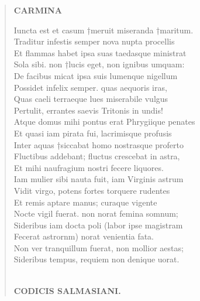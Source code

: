 \documentclass[11pt, a4paper]{report}
\begin{document}
\begin{verse}
     \marginpar{[188]} \begin{center} \textbf{CARMINA} \end{center}Iuncta est et casum †meruit miseranda †maritum. \\ Traditur infestis semper nova nupta procellis \\ Et flammas habet ipsa suas taedasque ministrat \\ Sola sibi. non †lucis eget, non ignibus umquam: \\ De facibus micat ipsa suis lumenque nigellum \\ Possidet infelix semper. quas aequoris iras, \\ Quas caeli terraeque lues miserabile vulgus \\ Pertulit, errantes saevis Tritonis in undis! \\ Atque domus mihi pontus erat Phrygiique penates \\ Et quasi iam pirata fui, lacrimisque profusis \\ Inter aquas †siccabat homo nostrasque proferto \\ Fluctibus addebant; fluctus crescebat in astra, \\ Et mihi naufragium nostri fecere liquores. \\ Iam mulier sibi nauta fuit, iam Virginis astrum \\ Vidit virgo, potens fortes torquere rudentes \\ Et remis aptare manus; curaque vigente \\ Nocte vigil fuerat. non norat femina somnum; \\ Sideribus iam docta poli (labor ipse magistram \\ Fecerat astrornm) norat venientia fata. \\ Non ver tranquillum fuerat, non mollior aestas; \\ Sideribus tempus, requiem non denique uorat. \\ 
        ﻿\pagebreak 
    \begin{center} \textbf{CODICIS SALMASIANI.} \end{center} \marginpar{[189]} 
      \end{verse}
  
\end{document}
